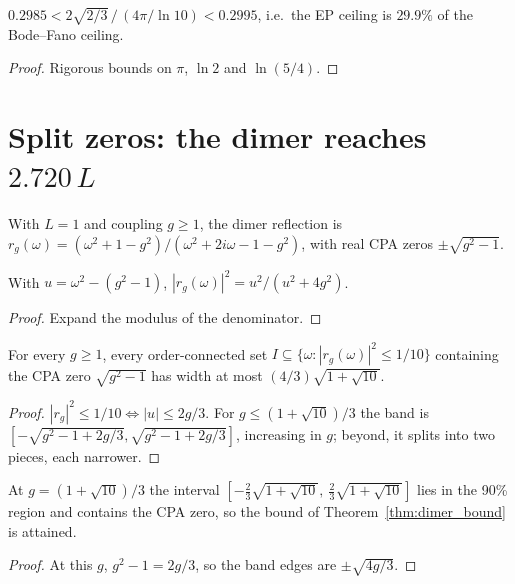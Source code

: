 \begin{lemma}\label{lem:ratio_bounds}
\leanok
{}
$0.2985< 2\sqrt{2/3}\,\big/\,(4\pi/\ln 10) < 0.2995$, i.e.\ the EP ceiling is $29.9\%$ of the
Bode--Fano ceiling.
\end{lemma}
\begin{proof}\leanok
Rigorous bounds on $\pi$, $\ln 2$ and $\ln(5/4)$.
\end{proof}

\chapter{Split zeros: the dimer reaches $2.720\,L$}

\begin{definition}\label{def:rD}
\leanok
With $L=1$ and coupling $g\ge1$, the dimer reflection is
$r_g(\omega)=(\omega^2+1-g^2)/(\omega^2+2i\omega-1-g^2)$, with real CPA zeros $\pm\sqrt{g^2-1}$.
\end{definition}

\begin{lemma}\label{lem:rD_normSq}
\leanok
{}
With $u=\omega^2-(g^2-1)$, $|r_g(\omega)|^2=u^2/(u^2+4g^2)$.
\end{lemma}
\begin{proof}\leanok
Expand the modulus of the denominator.
\end{proof}

\begin{theorem}\label{thm:dimer_bound}
\leanok
{}
For every $g\ge1$, every order-connected set $I\subseteq\{\omega:|r_g(\omega)|^2\le1/10\}$ containing the
CPA zero $\sqrt{g^2-1}$ has width at most $(4/3)\sqrt{1+\sqrt{10}}$.
\end{theorem}
\begin{proof}\leanok
$|r_g|^2\le1/10\iff|u|\le 2g/3$. For $g\le(1+\sqrt{10})/3$ the band is
$[-\sqrt{g^2-1+2g/3},\sqrt{g^2-1+2g/3}]$, increasing in $g$; beyond, it splits into two pieces, each
narrower.
\end{proof}

\begin{theorem}\label{thm:dimer_attained}
\leanok
{}
At $g=(1+\sqrt{10})/3$ the interval $[-\tfrac23\sqrt{1+\sqrt{10}},\ \tfrac23\sqrt{1+\sqrt{10}}]$ lies in
the 90\% region and contains the CPA zero, so the bound of Theorem~\ref{thm:dimer_bound} is attained.
\end{theorem}
\begin{proof}\leanok
At this $g$, $g^2-1=2g/3$, so the band edges are $\pm\sqrt{4g/3}$.
\end{proof}

